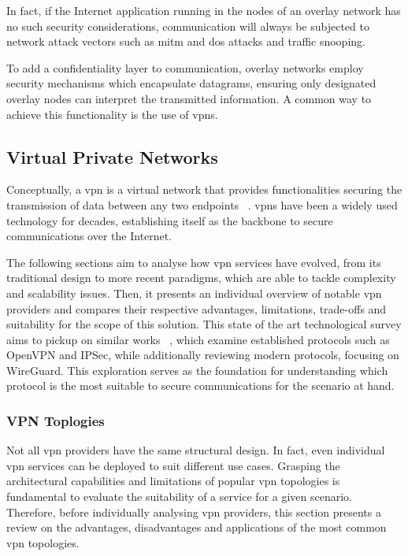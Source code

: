 \documentclass[11pt,twoside,a4paper]{report}
\begin{document}
In fact, if the Internet application running in the nodes of an overlay network has no such security considerations, communication will always be subjected to network attack vectors such as \ac{mitm} and \ac{dos} attacks and traffic snooping.

To add a confidentiality layer to communication, overlay networks employ security mechanisms which encapsulate datagrams, ensuring only designated overlay nodes can interpret the transmitted information. A common way to achieve this functionality is the use of \acp{vpn}.

\subsection{Virtual Private Networks}

Conceptually, a \ac{vpn} is a virtual network that provides functionalities  securing the transmission of data between any two endpoints ~\cite{HARMENING2017843}. \acp{vpn} have been a widely used technology for decades, establishing itself as the backbone to secure communications over the Internet.

The following sections aim to analyse how \ac{vpn} services have evolved, from its traditional design to more recent paradigms, which are able to tackle complexity and scalability issues. Then, it presents an individual overview of notable \ac{vpn} providers and compares their respective advantages, limitations, trade-offs and suitability for the scope of this solution. This state of the art technological survey aims to pickup on similar works ~\cite{zuqueteseguranca, berger2006analysis}, which examine established protocols such as OpenVPN and IPSec, while additionally reviewing modern protocols, focusing on WireGuard. This exploration serves as the foundation for understanding which protocol is the most suitable to secure communications for the scenario at hand.


\iffalse
\subsubsection{VPN Toplogies}

Not all \ac{vpn} providers have the same structural design. In fact, even individual \ac{vpn} services can be deployed to suit different use cases. Grasping the architectural capabilities and limitations of popular \ac{vpn} topologies is fundamental to evaluate the suitability of a service for a given scenario. Therefore, before individually analysing \ac{vpn} providers, this section presents a review on the advantages, disadvantages and applications of the most common \ac{vpn} topologies.
\end{document}
